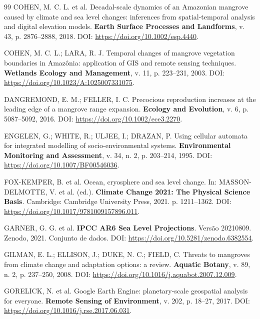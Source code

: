 \documentclass[12pt,a4paper]{article}
\begin{document}
\begin{thebibliography}{99}
COHEN, M. C. L. et al. Decadal-scale dynamics of an Amazonian mangrove caused by climate and sea level changes: inferences from spatial-temporal analysis and digital elevation models. \textbf{Earth Surface Processes and Landforms}, v. 43, p. 2876--2888, 2018. DOI: \url{https://doi.org/10.1002/esp.4440}.

COHEN, M. C. L.; LARA, R. J. Temporal changes of mangrove vegetation boundaries in Amazônia: application of GIS and remote sensing techniques. \textbf{Wetlands Ecology and Management}, v. 11, p. 223--231, 2003. DOI: \url{https://doi.org/10.1023/A:1025007331075}.

DANGREMOND, E. M.; FELLER, I. C. Precocious reproduction increases at the leading edge of a mangrove range expansion. \textbf{Ecology and Evolution}, v. 6, p. 5087--5092, 2016. DOI: \url{https://doi.org/10.1002/ece3.2270}.

ENGELEN, G.; WHITE, R.; ULJEE, I.; DRAZAN, P. Using cellular automata for integrated modelling of socio-environmental systems. \textbf{Environmental Monitoring and Assessment}, v. 34, n. 2, p. 203--214, 1995. DOI: \url{https://doi.org/10.1007/BF00546036}.

FOX-KEMPER, B. et al. Ocean, cryosphere and sea level change. In: MASSON-DELMOTTE, V. et al. (ed.). \textbf{Climate Change 2021: The Physical Science Basis}. Cambridge: Cambridge University Press, 2021. p. 1211--1362. DOI: \url{https://doi.org/10.1017/9781009157896.011}.

GARNER, G. G. et al. \textbf{IPCC AR6 Sea Level Projections}. Versão 20210809. Zenodo, 2021. Conjunto de dados. DOI: \url{https://doi.org/10.5281/zenodo.6382554}.

GILMAN, E. L.; ELLISON, J.; DUKE, N. C.; FIELD, C. Threats to mangroves from climate change and adaptation options: a review. \textbf{Aquatic Botany}, v. 89, n. 2, p. 237--250, 2008. DOI: \url{https://doi.org/10.1016/j.aquabot.2007.12.009}.

GORELICK, N. et al. Google Earth Engine: planetary-scale geospatial analysis for everyone. \textbf{Remote Sensing of Environment}, v. 202, p. 18--27, 2017. DOI: \url{https://doi.org/10.1016/j.rse.2017.06.031}.


\end{thebibliography}
\end{document}
